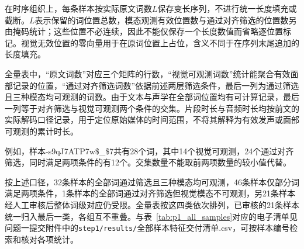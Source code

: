 在时序组织上，每条样本按实际原文词数$L$保存变长序列，不进行统一长度填充或截断。$L$表示保留的词位置总数，模态观测有效位置数与通过对齐筛选的位置数另由掩码统计；这些位置不必连续，因此不能仅保存一个长度数值而省略逐位置标记。视觉无效位置的零向量用于在原词位置上占位，含义不同于在序列末尾追加的长度填充。

全量表中，“原文词数”对应三个矩阵的行数，“视觉可观测词数”统计能聚合有效面部记录的位置，“通过对齐筛选词数”依据前述两层筛选条件，最后一列为通过筛选且三种模态均可观测的词数。由于文本与声学在全部词位置均有可计算记录，最后一列等于对齐筛选与视觉可观测两个条件的交集。片段时长与音频时长均按前文的实际解码口径记录，用于定位原始媒体的时间范围，不将其解释为有效发声或面部可观测的累计时长。

例如，样本-s9qJ7ATP7w\$\_\$7共有28个词，其中14个视觉可观测，24个通过对齐筛选，同时满足两项条件的有12个。交集数量不能取前两项数量的较小值代替。

按上述口径，32条样本的全部词通过筛选且三种模态均可观测，46条样本仅部分词满足两项条件，1条样本的全部词通过对齐筛选但视觉模态不可观测，另21条样本经人工审核后整体词级对应仍受限。全量表按这四类依次排列，已审核的21条样本统一归入最后一类，各组互不重叠。与表~\ref{tab:p1_all_samples}对应的电子清单见问题一提交附件中的\nolinkurl{step1/results/}\textnormal{全部样本特征交付清单.csv}，可按样本编号检索和核对各项统计。

